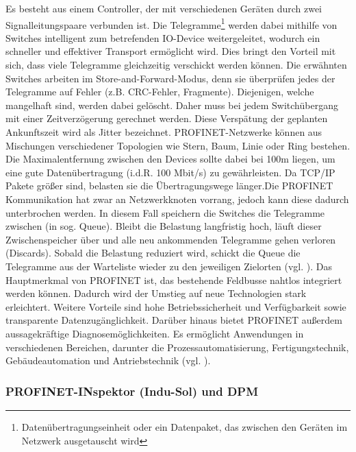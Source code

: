 Es besteht aus einem Controller, der mit verschiedenen Geräten durch zwei Signalleitungspaare verbunden ist. Die Telegramme\footnote{Datenübertragungseinheit oder ein Datenpaket, das zwischen den Geräten im Netzwerk ausgetauscht wird} werden dabei mithilfe von Switches intelligent zum betrefenden IO-Device weitergeleitet, wodurch ein schneller und effektiver Transport ermöglicht wird. Dies bringt den Vorteil mit sich, dass viele Telegramme gleichzeitig verschickt werden können. Die erwähnten Switches arbeiten im Store-and-Forward-Modus, denn sie überprüfen jedes der Telegramme auf Fehler (z.B. CRC-Fehler, Fragmente). Diejenigen, welche mangelhaft sind, werden dabei gelöscht. Daher muss bei jedem Switchübergang mit einer Zeitverzögerung gerechnet werden. Diese Verspätung der geplanten Ankunftszeit wird als Jitter bezeichnet. PROFINET-Netzwerke können aus Mischungen verschiedener Topologien wie Stern, Baum, Linie oder Ring bestehen. Die Maximalentfernung zwischen den Devices sollte dabei bei 100m liegen, um eine gute Datenübertragung (i.d.R. 100 Mbit/s) zu gewährleisten. Da TCP/IP Pakete größer sind, belasten sie die Übertragungswege länger.\clearpage \noindent Die PROFINET Kommunikation hat zwar an Netzwerkknoten vorrang, jedoch kann diese dadurch unterbrochen werden. In diesem Fall speichern die Switches die Telegramme zwischen (in sog. Queue). Bleibt die Belastung langfristig hoch, läuft dieser Zwischenspeicher über und alle neu ankommenden Telegramme gehen verloren (Discards). Sobald die Belastung reduziert wird, schickt die Queue die Telegramme aus der Warteliste wieder zu den jeweiligen Zielorten (vgl. \cite{InduSol2}). Das Hauptmerkmal von PROFINET ist, das bestehende Feldbusse nahtlos integriert werden können. Dadurch wird der Umstieg auf neue Technologien stark erleichtert. Weitere Vorteile sind hohe Betriebssicherheit und Verfügbarkeit sowie transparente Datenzugänglichkeit. Darüber hinaus bietet PROFINET außerdem aussagekräftige Diagnosemöglichkeiten. Es ermöglicht Anwendungen in verschiedenen Bereichen, darunter die Prozessautomatisierung, Fertigungstechnik, Gebäudeautomation und Antriebstechnik (vgl. \cite{fluke}).

\subsubsection{PROFINET-INspektor (Indu-Sol) und DPM}

